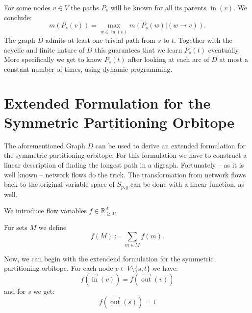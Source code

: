 \documentclass[a4paper]{amsart}
\theoremstyle{lemma}
\theoremstyle{definition}
\theoremstyle{remark}
\DeclareMathOperator{\In}{in}
\DeclareMathOperator{\Out}{out}
\newcommand{\ina}{\ensuremath{\vec{\In}}}
\newcommand{\outa}{\ensuremath{\vec{\Out}}}
\newcommand{\inv}{\ensuremath{\dot{\In}}}
\newcommand\mpar[1]{\marginpar {\flushleft\sffamily\small #1}}
\newcommand{\todo}[1]{\mpar{#1}}
\newcommand{\lr}[1]{\ensuremath{\left( #1 \right)}}
\begin{document}
For some nodes \(v \in V\) the paths \(P_s\) will be known for all its parents \(\inv{} \lr{v} \).  We conclude:
\[m\lr{P_s \lr{v}} = \max_{w \in \inv(v)}
m\lr{P_s(w) | \lr{w \rightarrow v }}\text{.}\]
The graph \(D\) admits at least one trivial path from \(s\) to \(t\).
Together with the acyclic and finite nature of \(D\) this guarantees that we
learn \(P_s (t)\) eventually.  More specifically we get to know \(P_s
(t)\) after looking at each arc of \(D\) at most a constant number of
times, using dynamic programming.




\todo{Bilder!}

\section{Extended Formulation for the Symmetric Partitioning Orbitope}
The aforementioned Graph \(D\) can be used to derive an extended
formulation for the  symmetric partitioning orbitope.  For this
formulation we have to construct a linear description of finding the
longest path in a digraph.  Fortunately -- as it is well known --
network flows do the trick.  The transformation from network flows
back to the original variable space of \(S^=_{p, q}\) can be done with
a linear function, as well.

We introduce flow variables \(f \in \mathbb{R}^A_{\geq 0}\).  

For sets \(M\) we define
\[f (M) := \sum_{m\in M} f(m)\text{.}\]

Now, we can begin with the extendend formulation for the 
symmetric partitioning orbitope.  For each node \(v \in V \setminus
\{s, t\}\) we have:
\begin{equation}
f\lr{\ina(v)} = f\lr{\outa(v)}
\end{equation}
and for \(s\) we get:
\begin{equation}
f\lr{\outa(s)} = 1
\end{equation}

\end{document}
